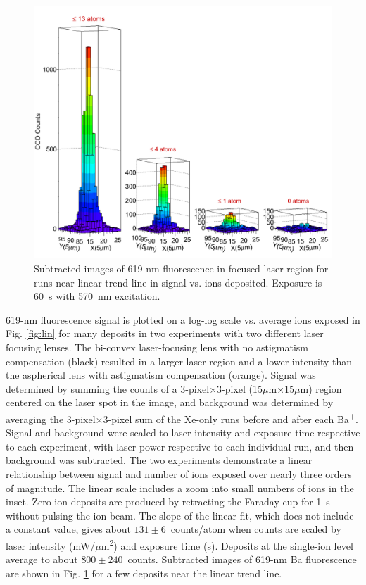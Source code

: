 \begin{figure} %
        \centering
                \includegraphics[width=.99\textwidth]{figures/train.png}
                \caption{Subtracted images of 619-nm fluorescence in focused laser region for runs near linear trend line in signal vs. ions deposited.  Exposure is 60~s with 570~nm excitation.}
\label{fig:train}
\end{figure}

619-nm fluorescence signal is plotted on a log-log scale vs. average ions exposed in Fig. \ref{fig:lin} for many deposits in two experiments with two different laser focusing lenses.  The bi-convex laser-focusing lens with no astigmatism compensation (black) resulted in a larger laser region and a lower intensity than the aspherical lens with astigmatism compensation (orange).  Signal was determined by summing the counts of a 3-pixel$\times$3-pixel (15$\mu$m$\times$15$\mu$m) region centered on the laser spot in the image, and background was determined by averaging the 3-pixel$\times$3-pixel sum of the Xe-only runs before and after each Ba\textsuperscript{+}.  Signal and background were scaled to laser intensity and exposure time respective to each experiment, with laser power respective to each individual run, and then background was subtracted.  The two experiments demonstrate a linear relationship between signal and number of ions exposed over nearly three orders of magnitude.  The linear scale includes a zoom into small numbers of ions in the inset.  Zero ion deposits are produced by retracting the Faraday cup for 1~s without pulsing the ion beam.  The slope of the linear fit, which does not include a constant value, gives about $131 \pm 6$~counts/atom when counts are scaled by laser intensity (mW/$\mu$m\textsuperscript{2}) and exposure time (s).  Deposits at the single-ion level average to about $800 \pm 240$~counts.  Subtracted images of 619-nm Ba fluorescence are shown in Fig. \ref{fig:train} for a few deposits near the linear trend line. %

